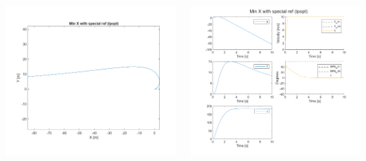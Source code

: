 \documentclass[aspectratio=169]{beamer}
\begin{document}
\begin{frame}
\begin{columns}
\begin{column}{0.25\textwidth}
			\includegraphics[width = \columnwidth]{figs/Min_X_with_special_ref_(ipopt)_quiver.png}
		\end{column}
		\begin{column}{0.4\textwidth}
			\includegraphics[width = \columnwidth]{figs/Min_X_with_special_ref_(ipopt)_traj.png}			
		\end{column}
	\end{columns}
\end{frame}
\end{document}
